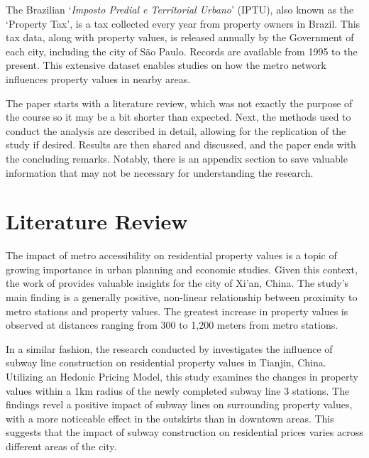 \documentclass[12pt]{gsis} %
\begin{document}
The Brazilian `\textit{Imposto Predial e Territorial Urbano}' (IPTU), also known as the `Property Tax', is a tax collected every year from property owners in Brazil.
This tax data, along with property values, is released annually by the Government of each city, including the city of São Paulo.
Records are available from 1995 to the present.
This extensive dataset enables studies on how the metro network influences property values in nearby areas.

The paper starts with a literature review, which was not exactly the purpose of the course so it may be a bit shorter than expected.
Next, the methods used to conduct the analysis are described in detail, allowing for the replication of the study if desired.
Results are then shared and discussed, and the paper ends with the concluding remarks.
Notably, there is an appendix section to save valuable information that may not be necessary for understanding the research.

\section{Literature Review}

The impact of metro accessibility on residential property values is a topic of growing importance in urban planning and economic studies.
Given this context, the work of \citet{LI201852} provides valuable insights for the city of Xi'an, China.
The study's main finding is a generally positive, non-linear relationship between proximity to metro stations and property values.
The greatest increase in property values is observed at distances ranging from 300 to 1,200 meters from metro stations.

In a similar fashion, the research conducted by \citet{sun2016impact} investigates the influence of subway line construction on residential property values in Tianjin, China.
Utilizing an Hedonic Pricing Model, this study examines the changes in property values within a 1km radius of the newly completed subway line 3 stations.
The findings revel a positive impact of subway lines on surrounding property values, with a more noticeable effect in the outskirts than in downtown areas.
This suggests that the impact of subway construction on residential prices varies across different areas of the city.
\end{document}
